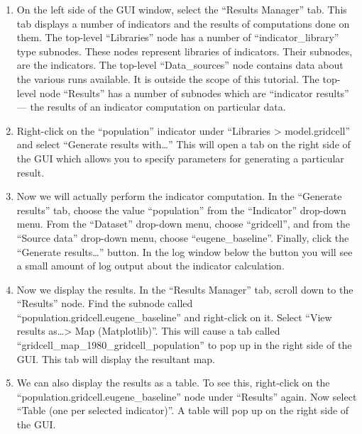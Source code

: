 \documentclass{howto}
\begin{document}
\begin{enumerate}

\item On the left side of the GUI window, select the ``Results Manager''
tab.  This tab displays a number of indicators and the results of
computations done on them.  The top-level ``Libraries'' node has a number
of \mbox{``indicator_library''} type subnodes.  These nodes represent
libraries of indicators.  Their subnodes, are the indicators.  The
top-level ``Data_sources'' node contains data about the various runs
available.  It is outside the scope of this tutorial.  The top-level node
``Results'' has a number of subnodes which are ``indicator results'' ---
the results of an indicator computation on particular data.

\item Right-click on the ``population'' indicator under ``Libraries >
model.gridcell'' and select ``Generate results with\ldots''  This will open a
tab on the right side of the GUI which allows you to specify parameters for
generating a particular result.

\item Now we will actually perform the indicator computation.  In the
``Generate results'' tab, choose the value ``population'' from the
``Indicator'' drop-down menu.  From the ``Dataset'' drop-down menu, choose
``gridcell'', and from the ``Source data'' drop-down menu, choose
``eugene_baseline''.  Finally, click the ``Generate results\ldots'' button.
In the log window below the button you will see a small amount of log
output about the indicator calculation.

\item Now we display the results.  In the ``Results Manager'' tab, scroll
down to the ``Results'' node.  Find the subnode called
``population.gridcell.eugene_baseline'' and right-click on it.  Select
``View results as\ldots > Map (Matplotlib)''.  This will cause a tab called
``gridcell_map_1980_gridcell_population'' to pop up in the right side of
the GUI.  This tab will display the resultant map.

\item We can also display the results as a table.  To see this, right-click on the ``population.gridcell.eugene_baseline'' node under ``Results'' again.  Now select ``Table (one per selected indicator)''.  A table will pop up on the right side of the GUI.

\end{enumerate}
\end{document}
